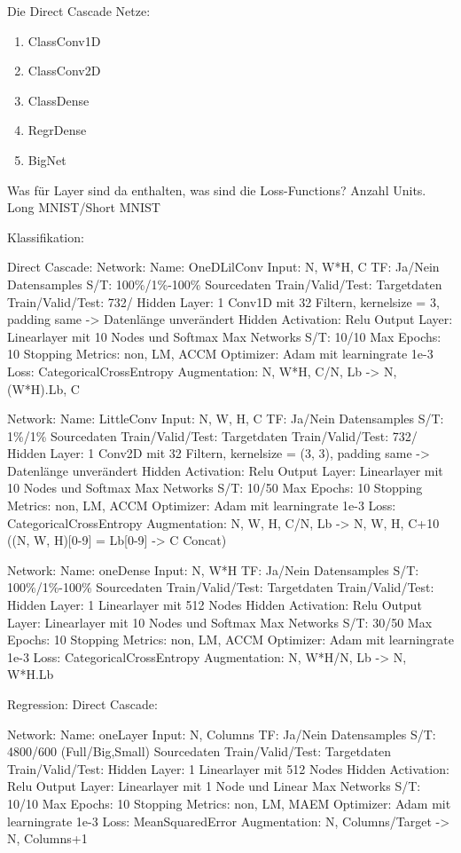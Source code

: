 Die Direct Cascade Netze: 
\begin{enumerate}
    \item ClassConv1D
    \item ClassConv2D
    \item ClassDense
    \item RegrDense
    \item BigNet
\end{enumerate}

Was für Layer sind da enthalten, was sind die Loss-Functions? Anzahl Units. Long MNIST/Short MNIST

Klassifikation: 

Direct Cascade:
Network: 
Name: OneDLilConv
Input: N, W*H, C
TF: Ja/Nein
Datensamples S/T: 100\%/1\%-100\%
Sourcedaten Train/Valid/Test: 
Targetdaten Train/Valid/Test: 732/
Hidden Layer: 1 Conv1D mit 32 Filtern, kernelsize = 3, padding same -> Datenlänge unverändert
Hidden Activation: Relu
Output Layer: Linearlayer mit 10 Nodes und Softmax
Max Networks S/T: 10/10
Max Epochs: 10
Stopping Metrics: non, LM, ACCM
Optimizer: Adam mit learningrate 1e-3
Loss: CategoricalCrossEntropy
Augmentation: N, W*H, C/N, Lb -> N, (W*H).Lb, C  %


Network: 
Name: LittleConv
Input: N, W, H, C
TF: Ja/Nein
Datensamples S/T: 1\%/1\%
Sourcedaten Train/Valid/Test: 
Targetdaten Train/Valid/Test: 732/
Hidden Layer: 1 Conv2D mit 32 Filtern, kernelsize = (3, 3), padding same -> Datenlänge unverändert
Hidden Activation: Relu
Output Layer: Linearlayer mit 10 Nodes und Softmax
Max Networks S/T: 10/50
Max Epochs: 10
Stopping Metrics: non, LM, ACCM
Optimizer: Adam mit learningrate 1e-3
Loss: CategoricalCrossEntropy
Augmentation: N, W, H, C/N, Lb -> N, W, H, C+10 ((N, W, H)[0-9] = Lb[0-9] -> C Concat)


Network:
Name: oneDense
Input: N, W*H
TF: Ja/Nein
Datensamples S/T: 100\%/1\%-100\%
Sourcedaten Train/Valid/Test: 
Targetdaten Train/Valid/Test: 
Hidden Layer: 1 Linearlayer mit 512 Nodes
Hidden Activation: Relu
Output Layer: Linearlayer mit 10 Nodes und Softmax
Max Networks S/T: 30/50
Max Epochs: 10
Stopping Metrics: non, LM, ACCM
Optimizer: Adam mit learningrate 1e-3
Loss: CategoricalCrossEntropy
Augmentation: N, W*H/N, Lb -> N, W*H.Lb



Regression:
Direct Cascade:

Network: 
Name: oneLayer
Input: N, Columns
TF: Ja/Nein
Datensamples S/T: 4800/600 (Full/Big,Small)
Sourcedaten Train/Valid/Test: 
Targetdaten Train/Valid/Test: 
Hidden Layer: 1 Linearlayer mit 512 Nodes
Hidden Activation: Relu
Output Layer: Linearlayer mit 1 Node und Linear
Max Networks S/T: 10/10
Max Epochs: 10
Stopping Metrics: non, LM, MAEM
Optimizer: Adam mit learningrate 1e-3
Loss: MeanSquaredError
Augmentation: N, Columns/Target -> N, Columns+1
\fi
